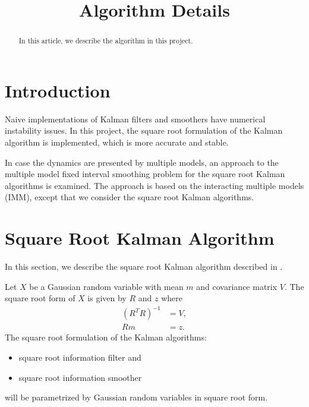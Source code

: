 \documentclass[microtype]{gtpart}     %
\title{Algorithm Details}
\author{}
\theoremstyle{definition}
\begin{document}
\begin{abstract}    %

In this article, we describe the algorithm in this project.

\end{abstract}

\maketitle


\section{Introduction}

Naive implementations of Kalman filters and smoothers have numerical instability issues.
In this project, the square root formulation of the Kalman algorithm is implemented, which is more accurate and stable. 

In case the dynamics are presented by multiple models,
an approach to the multiple model fixed interval smoothing problem for the square root Kalman algorithms is examined.
The approach is based on the interacting multiple models (IMM), except that we consider the square root Kalman algorithms.

\section{Square Root Kalman Algorithm}

In this section, we describe the square root Kalman algorithm described in \cite{bierman2006factorization}.

Let $X$ be a Gaussian random variable with mean $m$ and covariance matrix $V$.
The square root form of $X$ is given by $R$ and $z$ where
\begin{align*}
 (R^TR)^{-1} &= V, \\
 Rm &= z.
\end{align*}
The square root formulation of the Kalman algorithms:
\begin{itemize}
	\item square root information filter and
	\item square root information smoother
\end{itemize}
will be parametrized by Gaussian random variables in square root form.
\end{document}
